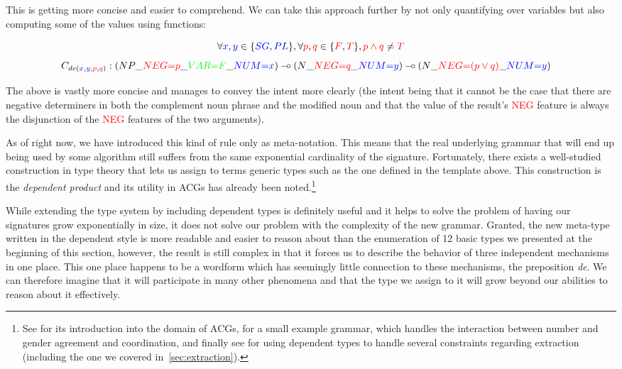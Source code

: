 This is getting more concise and easier to comprehend. We can take this
approach further by not only quantifying over variables but also
computing some of the values using functions:

$$
\forall \textcolor{blue}{x}, \textcolor{blue}{y} \in\{\textcolor{blue}{SG}, \textcolor{blue}{PL}\}, \forall \textcolor{red}{p}, \textcolor{red}{q} \in \{\textcolor{red}{F}, \textcolor{red}{T}\}, \textcolor{red}{p \land q} \neq \textcolor{red}{T}
$$
\begin{align*}
C_{de(\textcolor{blue}{x}, \textcolor{blue}{y}, \textcolor{red}{p}, \textcolor{red}{q})} &: (NP\_\textcolor{red}{NEG{=}p}\_\textcolor{green}{VAR{=}F}\_\textcolor{blue}{NUM{=}x}) \mathbin{{-}\mkern-3.5mu{\circ}} (N\_\textcolor{red}{NEG{=}q}\_\textcolor{blue}{NUM{=}y}) \mathbin{{-}\mkern-3.5mu{\circ}} (N\_\textcolor{red}{NEG{=}(p \lor q)}\_\textcolor{blue}{NUM{=}y})
\end{align*}

The above is vastly more concise and manages to convey the intent more
clearly (the intent being that it cannot be the case that there are
negative determiners in both the complement noun phrase and the modified
noun and that the value of the result's \textcolor{red}{NEG} feature is
always the disjunction of the \textcolor{red}{NEG} features of the two
arguments).

As of right now, we have introduced this kind of rule only as
meta-notation. This means that the real underlying grammar that will end
up being used by some algorithm still suffers from the same exponential
cardinality of the signature. Fortunately, there exists a well-studied
construction in type theory that lets us assign to terms generic types
such as the one defined in the template above. This construction is the
\emph{dependent product} and its utility in ACGs has already been
noted.\footnote{See \cite{de2007two} for its introduction into the
  domain of ACGs, \cite{de2007type} for a small example grammar, which
  handles the interaction between number and gender agreement and
  coordination, and finally see \cite{pogodalla2012controlling} for
  using dependent types to handle several constraints regarding
  extraction (including the one we covered in~\ref{sec:extraction}).}

While extending the type system by including dependent types is
definitely useful and it helps to solve the problem of having our
signatures grow exponentially in size, it does not solve our problem
with the complexity of the new grammar. Granted, the new meta-type
written in the dependent style is more readable and easier to reason
about than the enumeration of 12 basic types we presented at the
beginning of this section, however, the result is still complex in that
it forces us to describe the behavior of three independent mechanisms in
one place. This one place happens to be a wordform which has seemingly
little connection to these mechanisms, the preposition \emph{de}. We can
therefore imagine that it will participate in many other phenomena and
that the type we assign to it will grow beyond our abilities to reason
about it effectively.

